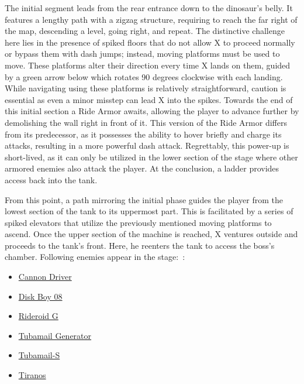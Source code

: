 The initial segment leads from the rear entrance down to the dinosaur's belly. It features a lengthy path with a zigzag structure, requiring to reach the far right of the map, descending a level, going right, and repeat. The distinctive challenge here lies in the presence of spiked floors that do not allow X to proceed normally or bypass them with dash jumps; instead, moving platforms must be used to move. These platforms alter their direction every time X lands on them, guided by a green arrow below which rotates 90 degrees clockwise with each landing. While navigating using these platforms is relatively straightforward,  caution is essential as even a minor misstep can lead X into the spikes. Towards the end of this initial section a Ride Armor awaits, allowing the player to advance further by demolishing the wall right in front of it. This version of the Ride Armor differs from its predecessor, as it possesses the ability to hover briefly and charge its attacks, resulting in a more powerful dash attack. Regrettably, this power-up is short-lived, as it can only be utilized in the lower section of the stage where other armored enemies also attack the player. At the conclusion, a ladder provides access back into the tank.

From this point, a path mirroring the initial phase guides the player from the lowest section of the tank to its uppermost part. This is facilitated by a series of spiked elevators that utilize the previously mentioned moving platforms to ascend. Once the upper section of the machine is reached, X ventures outside and proceeds to the tank's front. Here, he reenters the tank to access the boss's chamber.
Following enemies appear in the stage:~\cite{wiki:Dinosaur_tank}:
\begin{itemize}
	\item \hyperlink {enem:Cannon_Driver}{Cannon Driver}
	\item \hyperlink {enem:Disk_Boy_08}{Disk Boy 08}
	\item \hyperlink {enem:Rideroid G}{Rideroid G}
	\item \hyperlink {enem:Tubamail_Generator}{Tubamail Generator}
	\item \hyperlink {enem:Tubamail-S}{Tubamail-S}
	\item \hyperlink {enem:Tiranos}{Tiranos}
\end{itemize}


